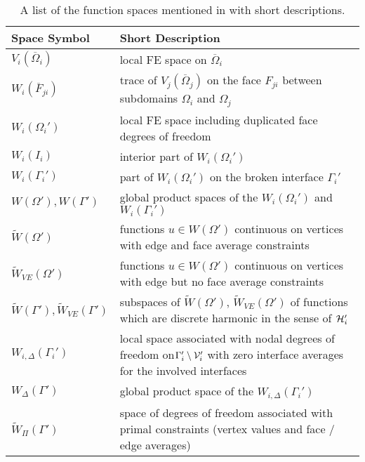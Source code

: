 {
\renewcommand{\arraystretch}{1.2}
\begin{table}[h]
    \centering
    \begin{tabular}{l p{9cm}}
         \hline 
         \textbf{Space Symbol} & \textbf{Short Description} \\\hline
         $V_i(\overline{\Omega}_i)$ & local FE space on $\overline{\Omega}_i$ \\
         $W_i(\overline{F}_{ji})$ & trace of $V_j(\overline{\Omega}_j)$ on the face $F_{ji}$ between \newline subdomains $\Omega_i$ and $\Omega_j$ \\
         $W_i(\Omega_i')$ & local FE space including duplicated face degrees of freedom \\
         $W_i(I_i)$ & interior part of $W_i(\Omega_i')$ \\
         $W_i(\Gamma_i')$ & part of $W_i(\Omega_i')$ on the broken interface $\Gamma_i'$ \\
         $W(\Omega'), W(\Gamma')$ & global product spaces of the $W_i(\Omega_i')$ and $W_i(\Gamma_i')$ \\
         $\widetilde{W}(\Omega')$ & functions $u \in W(\Omega')$ continuous on vertices \newline with edge and face average constraints \\
         $\widetilde{W}_{VE}(\Omega')$ & functions $u \in W(\Omega')$ continuous on vertices \newline with edge but no face average constraints \\
         $\widetilde{W}(\Gamma'),\widetilde{W}_{VE}(\Gamma')$ & subspaces of $\widetilde{W}(\Omega')$, $\widetilde{W}_{VE}(\Omega')$ of functions \newline which are discrete harmonic in the sense of $\mathcal{H}_i'$ \\
         $W_{i, \Delta}(\Gamma_i')$ & local space associated with nodal degrees of freedom on\newline $\Gamma_i'\setminus \mathcal{V}_i'$ with zero interface averages for the involved interfaces \\
         $W_{\Delta}(\Gamma')$ & global product space of the $W_{i, \Delta}(\Gamma_i')$ \\
         $\widetilde{W}_{\Pi}(\Gamma')$ & space of degrees of freedom associated with primal constraints (vertex values and face / edge averages)\\\hline
    \end{tabular}
    \caption{A list of the function spaces mentioned in  with short descriptions.}
    \label{tab:spaces}
\end{table}
}

